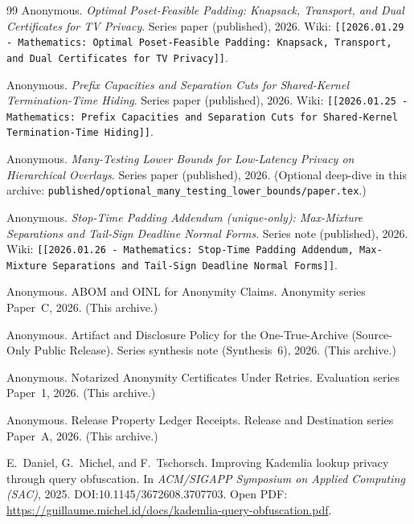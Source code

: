 \documentclass[11pt]{article}
\begin{document}
\begin{thebibliography}{99}
Anonymous.
\newblock \emph{Optimal Poset-Feasible Padding: Knapsack, Transport, and Dual Certificates for TV Privacy}.
\newblock Series paper (published), 2026.
\newblock Wiki: \texttt{[[2026.01.29 - Mathematics: Optimal Poset-Feasible Padding: Knapsack, Transport, and Dual Certificates for TV Privacy]]}.


Anonymous.
\newblock \emph{Prefix Capacities and Separation Cuts for Shared-Kernel Termination-Time Hiding}.
\newblock Series paper (published), 2026.
\newblock Wiki: \texttt{[[2026.01.25 - Mathematics: Prefix Capacities and Separation Cuts for Shared-Kernel Termination-Time Hiding]]}.


Anonymous.
\newblock \emph{Many-Testing Lower Bounds for Low-Latency Privacy on Hierarchical Overlays}.
\newblock Series paper (published), 2026. (Optional deep-dive in this archive: \texttt{published/optional\_many\_testing\_lower\_bounds/paper.tex}.)


Anonymous.
\newblock \emph{Stop-Time Padding Addendum (unique-only): Max-Mixture Separations and Tail-Sign Deadline Normal Forms}.
\newblock Series note (published), 2026.
\newblock Wiki: \texttt{[[2026.01.26 - Mathematics: Stop-Time Padding Addendum, Max-Mixture Separations and Tail-Sign Deadline Normal Forms]]}.


Anonymous.
\newblock ABOM and OINL for Anonymity Claims.
\newblock Anonymity series Paper~C, 2026. (This archive.)

Anonymous.
\newblock Artifact and Disclosure Policy for the One-True-Archive (Source-Only Public Release).
\newblock Series synthesis note (Synthesis~6), 2026. (This archive.)

Anonymous.
\newblock Notarized Anonymity Certificates Under Retries.
\newblock Evaluation series Paper~1, 2026. (This archive.)

Anonymous.
\newblock Release Property Ledger Receipts.
\newblock Release and Destination series Paper~A, 2026. (This archive.)

E.~Daniel, G.~Michel, and F.~Tschorsch.
\newblock Improving Kademlia lookup privacy through query obfuscation.
\newblock In \emph{ACM/SIGAPP Symposium on Applied Computing (SAC)}, 2025.
\newblock DOI:10.1145/3672608.3707703.
\newblock Open PDF: \url{https://guillaume.michel.id/docs/kademlia-query-obfuscation.pdf}.


\end{thebibliography}
\end{document}
